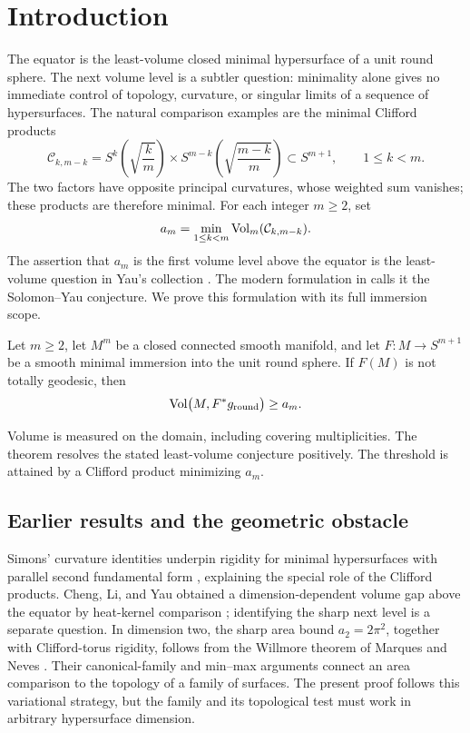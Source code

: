 \section{Introduction}
\label{sec:introduction}

The equator is the least-volume closed minimal hypersurface of a unit
round sphere. The next volume level is a subtler question: minimality
alone gives no immediate control of topology, curvature, or singular
limits of a sequence of hypersurfaces. The natural comparison examples
are the minimal Clifford products
\[
\mathcal C_{k,m-k}
=S^k\!\left(\sqrt{\frac{k}{m}}\right)
\times S^{m-k}\!\left(\sqrt{\frac{m-k}{m}}\right)
\subset S^{m+1},\qquad 1\le k<m.
\]
The two factors have opposite principal curvatures, whose weighted sum
vanishes; these products are therefore minimal. For each integer
\(m\ge2\), set
\[
a_m=\min_{1\le k<m}\operatorname{Vol}_m(\mathcal C_{k,m-k}).
\]
The assertion that \(a_m\) is the first volume level above the equator
is the least-volume question in Yau's collection
\cite[Problem~31]{Yau1994}. The modern formulation in
\cite[Conjecture~1.12(ii)]{GeLi2021} calls it the Solomon--Yau conjecture.
We prove this formulation with its full immersion scope.

\begin{theorem}\label{thm:volume}
Let \(m\ge2\), let \(M^m\) be a closed connected smooth manifold, and let
\(F:M\to S^{m+1}\) be a smooth minimal immersion into the unit round sphere.
If \(F(M)\) is not totally geodesic, then
\[
\operatorname{Vol}\bigl(M,F^*g_{\mathrm{round}}\bigr)\ge a_m.
\]
\end{theorem}

Volume is measured on the domain, including covering multiplicities.
The theorem resolves the stated least-volume conjecture positively.
The threshold is attained by a Clifford product minimizing \(a_m\).

\subsection*{Earlier results and the geometric obstacle}

Simons' curvature identities underpin rigidity for minimal hypersurfaces
with parallel second fundamental form \cite{Simons1968}, explaining the
special role of the Clifford products. Cheng, Li, and Yau obtained a
dimension-dependent volume gap above the equator by heat-kernel
comparison \cite[Corollary~5]{ChengLiYau1984}; identifying the sharp
next level is a separate question. In dimension two, the sharp
area bound \(a_2=2\pi^2\), together with Clifford-torus rigidity, follows
from the Willmore theorem of Marques and Neves
\cite[Theorem~B and Remark~1.3]{MarquesNeves2014}.
Their canonical-family and min--max arguments connect an area comparison
to the topology of a family of surfaces. The present proof follows this
variational strategy, but the family and its topological test must work
in arbitrary hypersurface dimension.

